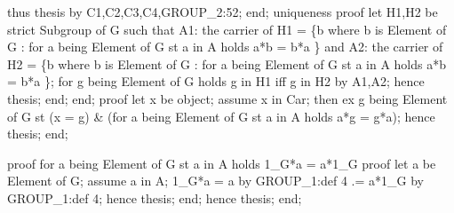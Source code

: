     thus thesis by C1,C2,C3,C4,GROUP_2:52;
  end;
  uniqueness
  proof
    let H1,H2 be strict Subgroup of G such that
A1: the carrier of H1 = \{b where b is Element of G : for a being Element of G
                                                     st a in A
                                                     holds a*b = b*a \} and
A2: the carrier of H2 = \{b where b is Element of G : for a being Element of G
                                                     st a in A
                                                     holds a*b = b*a \};
    for g being Element of G holds g in H1 iff g in H2 by A1,A2;
    hence thesis;
  end;
end;
\eatline
{}\nwendcode{}\nwdocspar
\nwenddocs{}\endmoddef\nwstartdeflinemarkup{}\nwenddeflinemarkup
proof
  let x be object;
  assume x in Car;
  then ex g being Element of G
       st (x = g) & (for a being Element of G st a in A holds a*g = g*a);
  hence thesis;
end;

\nwendcode{}\nwdocspar

\nwenddocs{}\endmoddef\nwstartdeflinemarkup{}\nwenddeflinemarkup
proof
  for a being Element of G st a in A holds 1_G*a = a*1_G
  proof
    let a be Element of G;
    assume a in A;
    1_G*a = a by GROUP_1:def 4
         .= a*1_G by GROUP_1:def 4;
    hence thesis;
  end;
  hence thesis;
end;
\nwendcode{}\nwdocspar

